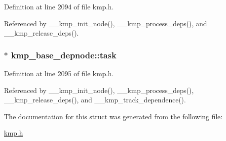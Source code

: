 Definition at line 2094 of file kmp.\-h.



Referenced by \-\_\-\-\_\-kmp\-\_\-init\-\_\-node(), \-\_\-\-\_\-kmp\-\_\-process\-\_\-deps(), and \-\_\-\-\_\-kmp\-\_\-release\-\_\-deps().

\hypertarget{structkmp__base__depnode_af23437a6227f2cad37c90e7320d9bdb9}{
\subsubsection[{task}]{$\ast$ kmp\-\_\-base\-\_\-depnode\-::task}}\label{structkmp__base__depnode_af23437a6227f2cad37c90e7320d9bdb9}


Definition at line 2095 of file kmp.\-h.



Referenced by \-\_\-\-\_\-kmp\-\_\-init\-\_\-node(), \-\_\-\-\_\-kmp\-\_\-process\-\_\-deps(), \-\_\-\-\_\-kmp\-\_\-release\-\_\-deps(), and \-\_\-\-\_\-kmp\-\_\-track\-\_\-dependence().



The documentation for this struct was generated from the following file\-:\begin{DoxyCompactItemize}
\item 
\hyperlink{kmp_8h}{kmp.\-h}\end{DoxyCompactItemize}
